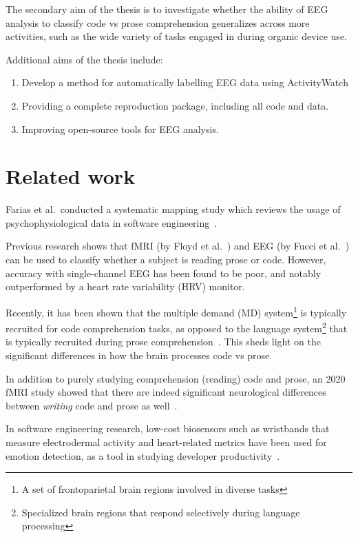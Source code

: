     The secondary aim of the thesis is to investigate whether the ability of EEG analysis to classify code vs prose comprehension generalizes across more activities, such as the wide variety of tasks engaged in during organic device use.

    Additional aims of the thesis include:

    \begin{enumerate}
        \item Develop a method for automatically labelling EEG data using ActivityWatch
        \item Providing a complete reproduction package, including all code and data.
        \item Improving open-source tools for EEG analysis.
    \end{enumerate}


\section{Related work}

    Farias et al.\ conducted a systematic mapping study which reviews the usage of psychophysiological data in software engineering~\cite{vieira_usage_2021}.

    Previous research shows that fMRI (by Floyd et al.~\cite{floyd_decoding_2017}) and EEG (by Fucci et al.~\cite{fucci_replication_2019}) can be used to classify whether a subject is reading prose or code. However, accuracy with single-channel EEG has been found to be poor, and notably outperformed by a heart rate variability (HRV) monitor.

    Recently, it has been shown that the multiple demand (MD) system\footnote{A set of frontoparietal brain regions involved in diverse tasks} is typically recruited for code comprehension tasks, as opposed to the language system\footnote{Specialized brain regions that respond selectively during language processing} that is typically recruited during prose comprehension~\cite{ivanova_comprehension_2020}. This sheds light on the significant differences in how the brain processes code vs prose.

    In addition to purely studying comprehension (reading) code and prose, an 2020 fMRI study showed that there are indeed significant neurological differences between \emph{writing} code and prose as well~\cite{noauthor_neurological_nodate}.

    In software engineering research, low-cost biosensors such as wristbands that measure electrodermal activity and heart-related metrics have been used for emotion detection, as a tool in studying developer productivity~\cite{girardi_recognizing_2020}.

